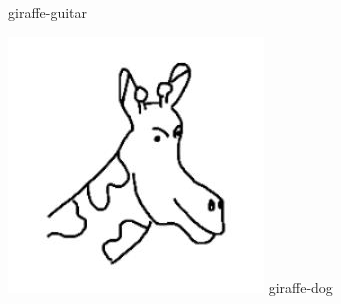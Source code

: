 \documentclass{article}
\begin{document}
\begin{center}
\begin{minipage}{0.142\textwidth}
        giraffe-guitar
    \end{minipage}%
    \begin{minipage}{0.142\textwidth}
        \includegraphics[width=\linewidth]{./pic/misclassified_r2_p0_1641.jpg}
        giraffe-dog
    \end{minipage}%


\end{center}
\end{document}
